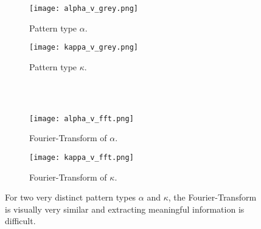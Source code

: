 \begin{figure}[h]
        \centering
        \begin{subfigure}[b]{0.3\textwidth}
                \texttt{[image: alpha\_v\_grey.png]}
                \caption{Pattern type $\alpha$.}
                \label{fig:alphagrey}
        \end{subfigure} \quad
        \begin{subfigure}[b]{0.3\textwidth}
                \texttt{[image: kappa\_v\_grey.png]}
                \caption{Pattern type $\kappa$.}
                \label{fig:kappagrey}
        \end{subfigure} \\
        ~ %
          
        \begin{subfigure}[b]{0.3\textwidth}
                \texttt{[image: alpha\_v\_fft.png]}
                \caption{Fourier-Transform of $\alpha$.}
                \label{fig:alphafft}
        \end{subfigure} \quad
        \begin{subfigure}[b]{0.3\textwidth}
                \texttt{[image: kappa\_v\_fft.png]}
                \caption{Fourier-Transform of $\kappa$.}
                \label{fig:kappafft}
        \end{subfigure}
        \caption{For two very distinct pattern types $\alpha$ and $\kappa$, the Fourier-Transform is visually very similar and extracting meaningful information is difficult.}\label{fig:fourierfail}
\end{figure}